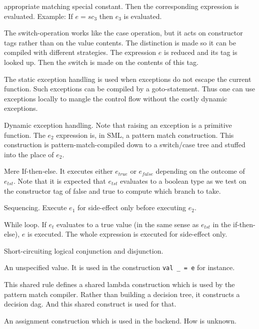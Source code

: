 \documentclass[a4paper, oneside, 10pt, draft]{memoir}
\begin{document}
\begin{description}
  appropriate matching special constant. Then the corresponding
  expression is evaluated. Example: If $e = sc_3$ then $e_3$ is
  evaluated.
\item[$\<switch>(a)\; e \<of> bt_1 \Rightarrow e_1, \; bt_2
  \Rightarrow e_2, \; \dotsc$] The switch-operation works like the
  case operation, but it acts on constructor tags rather than on the
  value contents. The distinction is made so it can be compiled with
  different strategies. The expression
  $e$ is reduced and its tag is looked up. Then the switch is made on
  the contents of this tag.
\item[$\<sfail>, e_1 \<shandle> e_2$] The static exception handling
  is used when exceptions do not escape the current function. Such
  exceptions can be compiled by a goto-statement. Thus one can use
  exceptions locally to mangle the control flow without the costly
  dynamic exceptions.
\item[$e_1 \<handle> e_2$] Dynamic exception handling. Note that
  raising an exception is a primitive function. The $e_2$ expression
  is, in SML, a pattern match construction. This construction is
  pattern-match-compiled down to a switch/case tree and stuffed into
  the place of $e_2$.
\item[$\<if> e_{tst} \<then> e_{true} \<else> e_{false}$] Mere
  If-then-else. It executes either $e_{true}$ or $e_{false}$ depending
  on the outcome of $e_{tst}$. Note that it is expected that $e_{tst}$
  evaluates to a boolean type as we test on the constructor tag of
  false and true to compute which branch to take.
\item[$e_1; \; e_2$] Sequencing. Execute $e_1$ for side-effect only
  before executing $e_2$.
\item[$\<while> e_t \<do> e$] While loop. If $e_t$ evaluates to a true
  value (in the same sense as $e_{tst}$ in the if-then-else), $e$ is
  executed. The whole expression is executed for side-effect only.
\item[$e \<andalso> e, e \<orelse> e$] Short-circuiting logical
  conjunction and disjunction.
\item[$unspec$] An unspecified value. It is used in the construction
  \texttt{val \_ = e} for instance.
\item[$\<shared>(k) \; e^{*}$] This shared rule defines a shared
  lambda construction which is used by the pattern match
  compiler. Rather than building a decision tree, it constructs a
  decision dag. And this shared construct is used for that.
\item[$\<assign> i \leftarrow e$] An assignment construction which
  is used in the backend. How is unknown.
\end{description}
\end{document}
